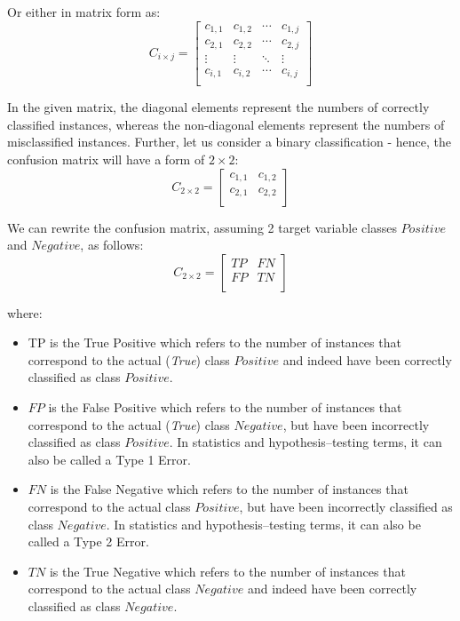 Or either in matrix form as:
\begin{equation}\label{eq}
    C_{i \times j} = \begin{bmatrix}
    c_{1,1} & c_{1,2} & \cdots & c_{1,j} \\
    c_{2,1} & c_{2,2} & \cdots & c_{2,j} \\
    \vdots & \vdots & \ddots & \vdots \\
    c_{i,1} & c_{i,2} & \cdots & c_{i,j} \\
    \end{bmatrix}
\end{equation}

In the given matrix, the diagonal elements represent the numbers of correctly classified instances, whereas the non-diagonal elements represent the numbers of misclassified instances.
Further, let us consider a binary classification - hence, the confusion matrix will have a form of $2\times 2$:
\begin{equation}
    C_{2 \times 2} = \begin{bmatrix}
    c_{1,1} & c_{1,2} \\
    c_{2,1} & c_{2,2} \\
    \end{bmatrix}
\end{equation}


We can rewrite the confusion matrix, assuming 2 target variable classes $Positive$ and $Negative$, as follows:
\begin{equation}
    C_{2 \times 2} = \begin{bmatrix}
    TP & FN \\
    FP & TN \\
    \end{bmatrix}
\end{equation}

where:
\begin{itemize}\setlength\itemsep{0em}
\item TP is the True Positive which refers to the number of instances that correspond to the actual (\textit{True}) class $Positive$ and indeed have been correctly classified as class $Positive$.
\item $FP$ is the False Positive which refers to the number of instances that correspond to the actual (\textit{True}) class $Negative$, but have been incorrectly classified as class $Positive$. In statistics and hypothesis--testing terms, it can also be called a Type 1 Error.
\item $FN$ is the False Negative which refers to the number of instances that correspond to the actual class $Positive$, but have been incorrectly classified as class $Negative$. In statistics and hypothesis--testing terms, it can also be called a Type 2 Error.
\item $TN$ is the True Negative which refers to the number of instances that correspond to the actual class $Negative$ and indeed have been correctly classified as class $Negative$.
\end{itemize}



